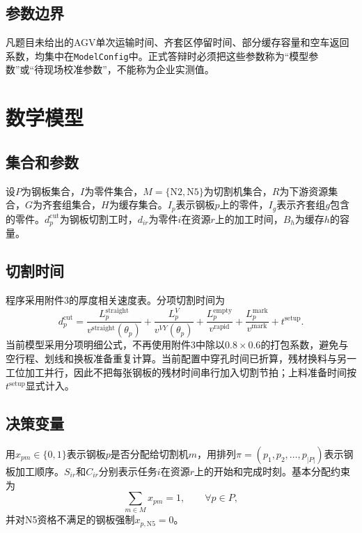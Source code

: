 \documentclass[UTF8,zihao=-4,openany]{ctexrep}
\newcommand{\code}[1]{\texttt{#1}}
\begin{document}
\section{参数边界}

凡题目未给出的AGV单次运输时间、齐套区停留时间、部分缓存容量和空车返回系数，均集中在\code{ModelConfig}中。正式答辩时必须把这些参数称为“模型参数”或“待现场校准参数”，不能称为企业实测值。

\chapter{数学模型}

\section{集合和参数}

设$P$为钢板集合，$I$为零件集合，$M=\{\mathrm{N2},\mathrm{N5}\}$为切割机集合，$R$为下游资源集合，$G$为齐套组集合，$H$为缓存集合。$I_p$表示钢板$p$上的零件，$I_g$表示齐套组$g$包含的零件。$d_p^{\mathrm{cut}}$为钢板切割工时，$d_{ir}$为零件$i$在资源$r$上的加工时间，$B_h$为缓存$h$的容量。

\section{切割时间}

程序采用附件3的厚度相关速度表。分项切割时间为
\begin{equation}
 d_p^{\mathrm{cut}}=
 \frac{L_p^{\mathrm{straight}}}{v^{\mathrm{straight}}(\theta_p)}
 +\frac{L_p^{V}}{v^{VY}(\theta_p)}
 +\frac{L_p^{\mathrm{empty}}}{v^{\mathrm{rapid}}}
 +\frac{L_p^{\mathrm{mark}}}{v^{\mathrm{mark}}}
 +t^{\mathrm{setup}}.
\end{equation}
当前模型采用分项明细公式，不再使用附件3中除以$0.8\times0.6$的打包系数，避免与空行程、划线和换板准备重复计算。当前配置中穿孔时间已折算，残材换料与另一工位加工并行，因此不把每张钢板的残材时间串行加入切割节拍；上料准备时间按$t^{\mathrm{setup}}$显式计入。

\section{决策变量}

用$x_{pm}\in\{0,1\}$表示钢板$p$是否分配给切割机$m$，用排列$\pi=(p_1,p_2,\ldots,p_{|P|})$表示钢板加工顺序。$S_{ir}$和$C_{ir}$分别表示任务$i$在资源$r$上的开始和完成时刻。基本分配约束为
\begin{equation}
 \sum_{m\in M}x_{pm}=1,\qquad \forall p\in P,
\end{equation}
并对N5资格不满足的钢板强制$x_{p,\mathrm{N5}}=0$。
\end{document}
